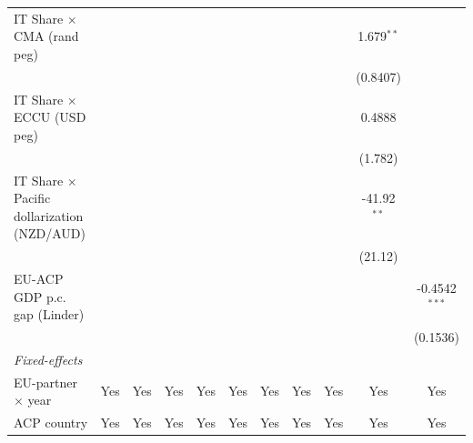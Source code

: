 \begin{tabular}{lcccccccccc}
   IT Share $\times$ CMA (rand peg)                   &                &                 &                &                 &                &                &                  &                & 1.679$^{**}$        &   \\   
                                                      &                &                 &                &                 &                &                &                  &                & (0.8407)            &   \\   
   IT Share $\times$ ECCU (USD peg)                   &                &                 &                &                 &                &                &                  &                & 0.4888              &   \\   
                                                      &                &                 &                &                 &                &                &                  &                & (1.782)             &   \\   
   IT Share $\times$ Pacific dollarization (NZD/AUD)  &                &                 &                &                 &                &                &                  &                & -41.92$^{**}$       &   \\   
                                                      &                &                 &                &                 &                &                &                  &                & (21.12)             &   \\   
   EU-ACP GDP p.c. gap (Linder)                       &                &                 &                &                 &                &                &                  &                &                     & -0.4542$^{***}$\\   
                                                      &                &                 &                &                 &                &                &                  &                &                     & (0.1536)\\   
   \midrule
   \emph{Fixed-effects}\\
   EU-partner $\times$ year                           & Yes            & Yes             & Yes            & Yes             & Yes            & Yes            & Yes              & Yes            & Yes                 & Yes\\  
   ACP country                                        & Yes            & Yes             & Yes            & Yes             & Yes            & Yes            & Yes              & Yes            & Yes                 & Yes\\  

\end{tabular}

